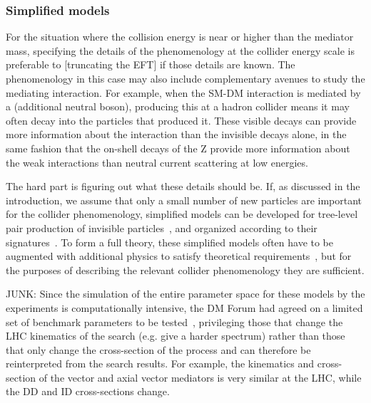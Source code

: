 
\subsubsection{Simplified models}
\label{sub:simplifiedModels}

For the situation where the collision energy is near or higher than the mediator mass, 
specifying the details
of the phenomenology at the collider energy scale is preferable to [truncating the EFT] if those details are known. 
The phenomenology in this case may also include complementary avenues to study the mediating interaction.
For example, when the SM-DM interaction is mediated by a \Zprime (additional neutral boson), producing 
this \Zprime at a hadron collider means it may often decay into the particles that produced it. 
These visible decays can provide more information about the interaction than the invisible decays alone, 
in the same fashion that the on-shell decays of the Z provide more information about the weak interactions than 
neutral current scattering at low energies.

The hard part is figuring out what these details should be. If, as discussed in the introduction,
we assume that only a small number of new particles are important for the collider phenomenology, simplified models can be developed for tree-level pair
production of invisible particles~\cite{Alwall:2008ag, Agrawal:2010fh, Alves:2011wf, Choudhury:2015lha}, and %
organized according to their signatures~\cite{Abercrombie:2015wmb}. 
To form a full theory, these simplified models often have to be augmented with additional physics to satisfy theoretical requirements~\cite{Kahlhoefer:2015bea},
but for the purposes of describing the relevant collider phenomenology they are sufficient. 

JUNK: Since the simulation of the entire parameter space for these models by the experiments is computationally intensive, the DM Forum had agreed on a limited set of benchmark parameters to be tested~\cite{Abercrombie:2015wmb}, privileging those that change the LHC kinematics of the search (e.g. give a harder \MET spectrum) rather than those that only change the cross-section of the process and can therefore be reinterpreted from the search results. For example, the kinematics and cross-section of the vector and axial vector mediators is very similar at the LHC, while the DD and ID cross-sections change. 


